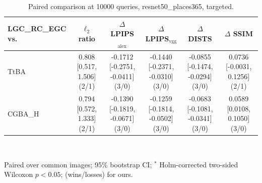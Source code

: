\begin{table}[t]
\centering\footnotesize
\caption{Paired comparison at 10000 queries, resnet50\_places365, targeted.}
\begin{tabular}{lccccc}
\toprule
LGC\_RC\_EGC vs. & $\ell_2$ ratio & $\Delta$ LPIPS$_{\mathrm{alex}}$ & $\Delta$ LPIPS$_{\mathrm{vgg}}$ & $\Delta$ DISTS & $\Delta$ SSIM \\
\midrule
TtBA & 0.808 [0.517, 1.506] (2/1) & -0.1712 [-0.2751, -0.0411] (3/0) & -0.1440 [-0.2371, -0.0310] (3/0) & -0.0855 [-0.1474, -0.0294] (3/0) & 0.0736 [-0.0031, 0.1256] (2/1) \\
CGBA\_H & 0.794 [0.572, 1.333] (2/1) & -0.1390 [-0.1819, -0.0671] (3/0) & -0.1259 [-0.1814, -0.0502] (3/0) & -0.0683 [-0.1081, -0.0341] (3/0) & 0.0589 [0.0108, 0.1050] (3/0) \\
\bottomrule
\end{tabular}
\\[2pt]\parbox{\linewidth}{\scriptsize Paired over common images; 95\% bootstrap CI; $^{*}$ Holm-corrected two-sided Wilcoxon $p<0.05$; (wins/losses) for ours.}
\end{table}
